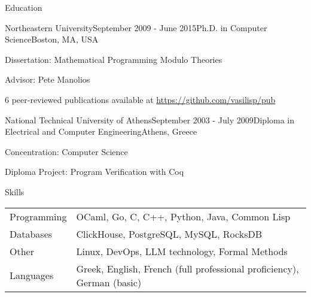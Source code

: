 \documentclass[11pt]{resume}
\begin{document}
\begin{rSection}{Education}

  \begin{rSubsection}{Northeastern University}{September 2009 -
      June 2015}{Ph.D. in Computer Science}{Boston, MA, USA}
  \item Dissertation: Mathematical Programming Modulo Theories
  \item Advisor: Pete Manolios
  \item 6 peer-reviewed publications available at
    \url{https://github.com/vasilisp/pub}
  \end{rSubsection}

  \begin{rSubsection}{National Technical University of Athens}{September 2003 -
      July 2009}{Diploma in Electrical and Computer
      Engineering}{Athens, Greece}
  \item Concentration: Computer Science
  \item Diploma Project: Program Verification with Coq
  \end{rSubsection}
	
\end{rSection}

\begin{rSection}{Skills}

  \begin{tabular}{ll}
    Programming & OCaml, Go, C, C++, Python, Java, Common Lisp \\

    Databases & ClickHouse, PostgreSQL, MySQL, RocksDB \\

    Other & Linux, DevOps, LLM technology, Formal Methods \\

    Languages & Greek, English, French (full professional
    proficiency), German (basic)
  \end{tabular}

\end{rSection}
\end{document}
